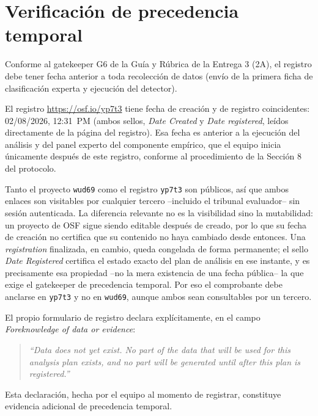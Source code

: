\documentclass[11pt,a4paper]{article}
\begin{document}
\section*{Verificación de precedencia temporal}

Conforme al gatekeeper G6 de la Guía y Rúbrica de la Entrega 3 (2A), el registro debe
tener fecha anterior a toda recolección de datos (envío de la primera ficha de
clasificación experta y ejecución del detector).

El registro \url{https://osf.io/yp7t3} tiene fecha de creación y de registro
coincidentes: 02/08/2026, 12:31~PM (ambos sellos, \textit{Date Created} y
\textit{Date registered}, leídos directamente de la página del registro). Esa
fecha es anterior a la ejecución del análisis y del panel experto del componente
empírico, que el equipo inicia únicamente después de este registro, conforme al
procedimiento de la Sección 8 del protocolo.

Tanto el proyecto \texttt{wud69} como el registro \texttt{yp7t3} son públicos,
así que ambos enlaces son visitables por cualquier tercero --incluido el
tribunal evaluador-- sin sesión autenticada. La diferencia relevante no es la
visibilidad sino la mutabilidad: un proyecto de OSF sigue siendo editable
después de creado, por lo que su fecha de creación no certifica que su
contenido no haya cambiado desde entonces. Una \textit{registration}
finalizada, en cambio, queda congelada de forma permanente; el sello
\textit{Date Registered} certifica el estado exacto del plan de análisis en
ese instante, y es precisamente esa propiedad --no la mera existencia de una
fecha pública-- la que exige el gatekeeper de precedencia temporal. Por eso el
comprobante debe anclarse en \texttt{yp7t3} y no en \texttt{wud69}, aunque
ambos sean consultables por un tercero.

El propio formulario de registro declara explícitamente, en el campo
\textit{Foreknowledge of data or evidence}:

\begin{quote}
\itshape
``Data does not yet exist. No part of the data that will be used for this analysis
plan exists, and no part will be generated until after this plan is registered.''
\end{quote}

Esta declaración, hecha por el equipo al momento de registrar, constituye evidencia
adicional de precedencia temporal.
\end{document}
